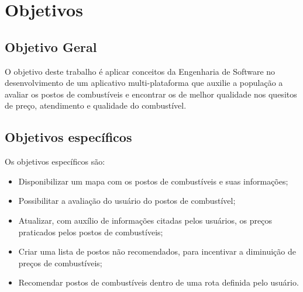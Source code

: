 \section{Objetivos}

\subsection{Objetivo Geral}

O objetivo deste trabalho é aplicar conceitos da Engenharia de Software no desenvolvimento de um aplicativo multi-plataforma que auxilie a população a avaliar os postos de combustíveis e encontrar os de melhor qualidade nos quesitos de preço, atendimento e qualidade do combustível.

\subsection{Objetivos específicos}

Os objetivos específicos são:
\begin{itemize}
    \item Disponibilizar um mapa com os postos de combustíveis e suas informações;
    \item Possibilitar a avaliação do usuário do postos de combustível;
    \item Atualizar, com auxílio de informações citadas pelos usuários, os preços praticados pelos postos de combustíveis;
    \item Criar uma lista de postos não recomendados, para incentivar a diminuição de preços de combustíveis;
    \item Recomendar postos de combustíveis dentro de uma rota definida pelo usuário.
\end{itemize}
